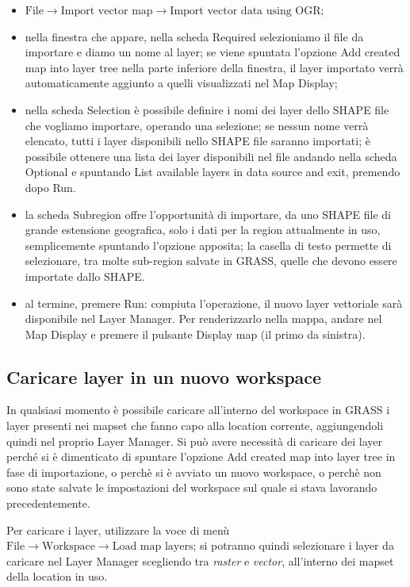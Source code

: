 	\begin{itemize}
		\item \textsf{$\text{File}\rightarrow\text{Import~vector~map}\rightarrow\text{Import~vector~data~using~OGR}$};
		\item nella finestra che appare, nella scheda \textsf{Required} selezioniamo il file da importare e diamo un nome al layer; se viene spuntata l'opzione \textsf{Add created map into layer tree }nella parte inferiore della finestra, il layer importato verrà automaticamente aggiunto a quelli visualizzati nel Map Display;
		\item nella scheda \textsf{Selection} è possibile definire i nomi dei layer dello SHAPE file che vogliamo importare, operando una selezione; se nessun nome verrà elencato, tutti i layer disponibili nello SHAPE file saranno importati; è possibile ottenere una lista dei layer disponibili nel file andando nella scheda \textsf{Optional} e spuntando \textsf{List available layers in data source and exit}, premendo dopo \textsf{Run}.
		\item la scheda \textsf{Subregion} offre l'opportunità di importare, da uno SHAPE file di grande estensione geografica, solo i dati per la region attualmente in uso, semplicemente spuntando l'opzione apposita; la casella di testo permette di selezionare, tra molte sub-region salvate in GRASS, quelle che devono essere importate dallo SHAPE.
		\item al termine, premere \textsf{Run}: compiuta l'operazione, il nuovo layer vettoriale sarà disponibile nel Layer Manager. Per renderizzarlo nella mappa, andare nel Map Display e premere il pulsante \textsf{Display map }(il primo da sinistra).
	\end{itemize}

	\subsection{Caricare layer in un nuovo workspace}
		In qualsiasi momento è possibile caricare all'interno del workspace in GRASS i layer presenti nei mapset che fanno capo alla location corrente, aggiungendoli quindi nel proprio Layer Manager. Si può avere necessità di caricare dei layer perché si è dimenticato di spuntare l'opzione \textsf{Add created map into layer tree} in fase di importazione, o perchè si è avviato un nuovo workspace, o perchè non sono state salvate le impostazioni del workspace sul quale si stava lavorando precedentemente.

		Per caricare i layer, utilizzare la voce di menù \textsf{$\text{File}\rightarrow\text{Workspace}\rightarrow\text{Load map layers}$}; si potranno quindi selezionare i layer da caricare nel Layer Manager scegliendo tra \emph{raster} e \emph{vector}, all'interno dei mapset della location in uso.


